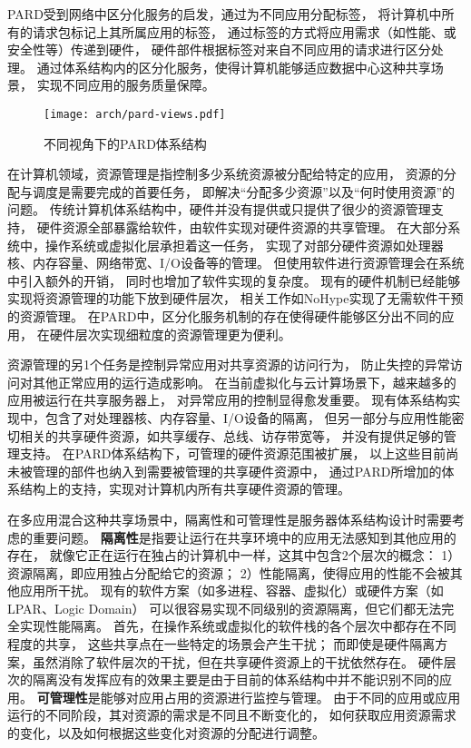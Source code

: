 PARD受到网络中区分化服务的启发，通过为不同应用分配标签，
将计算机中所有的请求包标记上其所属应用的标签，
通过标签的方式将应用需求（如性能、或安全性等）传递到硬件，
硬件部件根据标签对来自不同应用的请求进行区分处理。
通过体系结构内的区分化服务，使得计算机能够适应数据中心这种共享场景，
实现不同应用的服务质量保障。

\begin{figure}[t]
  \centering
  \texttt{[image: arch/pard-views.pdf]}
  \caption{不同视角下的PARD体系结构}
  \label{fig:pard-views}
\end{figure}

在计算机领域，资源管理是指控制多少系统资源被分配给特定的应用，
资源的分配与调度是需要完成的首要任务，
即解决``分配多少资源''以及``何时使用资源''的问题。
传统计算机体系结构中，硬件并没有提供或只提供了很少的资源管理支持，
硬件资源全部暴露给软件，由软件实现对硬件资源的共享管理。
在大部分系统中，操作系统或虚拟化层承担着这一任务，
实现了对部分硬件资源如处理器核、内存容量、网络带宽、I/O设备等的管理。
但使用软件进行资源管理会在系统中引入额外的开销\cite{xen-overhead2005,
Stadtmueller:2015, Reddy:2014}，
同时也增加了软件实现的复杂度。
现有的硬件机制已经能够实现将资源管理的功能下放到硬件层次，
相关工作如NoHype\cite{keller_nohype:_2010}实现了无需软件干预的资源管理。
在PARD中，区分化服务机制的存在使得硬件能够区分出不同的应用，
在硬件层次实现细粒度的资源管理更为便利。



资源管理的另1个任务是控制异常应用对共享资源的访问行为，
防止失控的异常访问对其他正常应用的运行造成影响。
在当前虚拟化与云计算场景下，越来越多的应用被运行在共享服务器上，
对异常应用的控制显得愈发重要。
现有体系结构实现中，包含了对处理器核、内存容量、I/O设备的隔离，
但另一部分与应用性能密切相关的共享硬件资源，如共享缓存、总线、访存带宽等，
并没有提供足够的管理支持。
在PARD体系结构下，可管理的硬件资源范围被扩展，
以上这些目前尚未被管理的部件也纳入到需要被管理的共享硬件资源中，
通过PARD所增加的体系结构上的支持，实现对计算机内所有共享硬件资源的管理。

在多应用混合这种共享场景中，隔离性和可管理性是服务器体系结构设计时需要考虑的重要问题。
\textbf{隔离性}是指要让运行在共享环境中的应用无法感知到其他应用的存在，
就像它正在运行在独占的计算机中一样，这其中包含2个层次的概念：
1）资源隔离，即应用独占分配给它的资源；
2）性能隔离，使得应用的性能不会被其他应用所干扰。
现有的软件方案（如多进程、容器、虚拟化）或硬件方案（如LPAR、Logic Domain）
可以很容易实现不同级别的资源隔离，但它们都无法完全实现性能隔离。
首先，在操作系统或虚拟化的软件栈的各个层次中都存在不同程度的共享，
这些共享点在一些特定的场景会产生干扰；
而即使是硬件隔离方案，虽然消除了软件层次的干扰，但在共享硬件资源上的干扰依然存在。
硬件层次的隔离没有发挥应有的效果主要是由于目前的体系结构中并不能识别不同的应用。
\textbf{可管理性}是能够对应用占用的资源进行监控与管理。
由于不同的应用或应用运行的不同阶段，其对资源的需求是不同且不断变化的，
如何获取应用资源需求的变化，以及如何根据这些变化对资源的分配进行调整。

